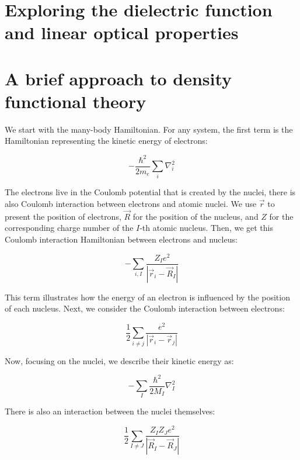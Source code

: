 \newpage
\section{Exploring the dielectric function and linear optical properties}

\newpage
\section{A brief approach to density functional theory}

We start with the many-body Hamiltonian. For any system, the first term is the Hamiltonian representing the kinetic energy of electrons:

\begin{equation}
    -\frac{\hbar^2}{2m_e}\sum_i\nabla_i^2
    \label{electrons_kinetic}
\end{equation}

The electrons live in the Coulomb potential that is created by the nuclei, there is also Coulomb interaction between electrons and atomic nuclei. We use $\Vec{r}$ to present the position of electrons, $\Vec{R}$ for the position of the nucleus, and $Z$ for the corresponding charge number of the $I$-th atomic nucleus. Then, we get this Coulomb interaction Hamiltonian between electrons and nucleus:

\begin{equation}
    -\sum_{i,I}\frac{Z_I e^2}{|\Vec{r}_i-\Vec{R}_I|}
    \label{electrons_nucleus_Coulomb}
\end{equation}

This term illustrates how the energy of an electron is influenced by the position of each nucleus. Next, we consider the Coulomb interaction between electrons:

\begin{equation}
    \frac{1}{2}\sum_{i\neq j}\frac{e^2}{|\Vec{r}_i-\Vec{r}_j|}
    \label{electrons_Coulomb}
\end{equation}

Now, focusing on the nuclei, we describe their kinetic energy as:   

\begin{equation}
    -\sum_I\frac{\hbar^2}{2M_I}\nabla_I^2
    \label{nucleus_kinetic}
\end{equation}

There is also an interaction between the nuclei themselves:

\begin{equation}
    \frac{1}{2}\sum_{I\neq J}\frac{Z_I Z_J e^2}{|\Vec{R}_I-\Vec{R}_J|}
    \label{nucleus_interaction}
\end{equation}


